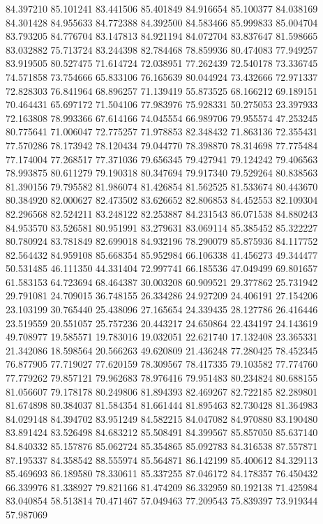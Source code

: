 84.397210
85.101241
83.441506
85.401849
84.916654
85.100377
84.038169
84.301428
84.955633
84.772388
84.392500
84.583466
85.999833
85.004704
83.793205
84.776704
83.147813
84.921194
84.072704
83.837647
81.598665
83.032882
75.713724
83.244398
82.784468
78.859936
80.474083
77.949257
83.919505
80.527475
71.614724
72.038951
77.262439
72.540178
73.336745
74.571858
73.754666
65.833106
76.165639
80.044924
73.432666
72.971337
72.828303
76.841964
68.896257
71.139419
55.873525
68.166212
69.189151
70.464431
65.697172
71.504106
77.983976
75.928331
50.275053
23.397933
72.163808
78.993366
67.614166
74.045554
66.989706
79.955574
47.253245
80.775641
71.006047
72.775257
71.978853
82.348432
71.863136
72.355431
77.570286
78.173942
78.120434
79.044770
78.398870
78.314698
77.775484
77.174004
77.268517
77.371036
79.656345
79.427941
79.124242
79.406563
78.993875
80.611279
79.190318
80.347694
79.917340
79.529264
80.838563
81.390156
79.795582
81.986074
81.426854
81.562525
81.533674
80.443670
80.384920
82.000627
82.473502
83.626652
82.806853
84.452553
82.109304
82.296568
82.524211
83.248122
82.253887
84.231543
86.071538
84.880243
84.953570
83.526581
80.951991
83.279631
83.069114
85.385452
85.322227
80.780924
83.781849
82.699018
84.932196
78.290079
85.875936
84.117752
82.564432
84.959108
85.668354
85.952984
66.106338
41.456273
49.344477
50.531485
46.111350
44.331404
72.997741
66.185536
47.049499
69.801657
61.583153
64.723694
68.464387
30.003208
60.909521
29.377862
25.731942
29.791081
24.709015
36.748155
26.334286
24.927209
24.406191
27.154206
23.103199
30.765440
25.438096
27.165654
24.339435
28.127786
26.416446
23.519559
20.551057
25.757236
20.443217
24.650864
22.434197
24.143619
49.708977
19.585571
19.783016
19.032051
22.621740
17.132408
23.365331
21.342086
18.598564
20.566263
49.620809
21.436248
77.280425
78.452345
76.877905
77.719027
77.620159
78.309567
78.417335
79.103582
77.774760
77.779262
79.857121
79.962683
78.976416
79.951483
80.234824
80.688155
81.056607
79.178178
80.249806
81.894393
82.469267
82.722185
82.289801
81.674898
80.384037
81.584354
81.661444
81.895463
82.730428
81.364983
84.029148
84.394702
83.951249
84.582215
84.047082
84.970880
83.190480
83.891424
83.526498
84.683212
85.508491
84.399567
85.857050
85.637140
84.840332
85.157876
85.062724
85.354865
85.092783
84.316538
87.557871
87.195337
84.358542
88.555974
85.564871
86.142199
85.400612
84.329113
85.469693
86.189580
78.330611
85.337255
87.046172
84.178357
76.450432
66.339976
81.338927
79.821166
81.474209
86.332959
80.192138
71.425984
83.040854
58.513814
70.471467
57.049463
77.209543
75.839397
73.919344
57.987069
